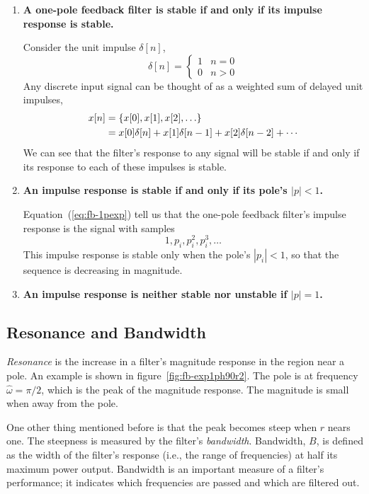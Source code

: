 \begin{enumerate}
\item \textbf{A one-pole feedback filter is stable if and only if its
impulse response is stable.}

Consider the unit impulse $\delta[n]$,
\begin{equation}
\delta[n] = 
\left\{\begin{array}{rl}
1 & n=0\\
0 & n>0
\end{array}\right.
\end{equation}
Any discrete input signal can be thought of as a weighted sum of
delayed unit impulses,
\begin{align}
x[n] &= \{x[0], x[1], x[2], \ldots\} \notag \\
     &= x[0]\delta[n] + x[1]\delta[n-1] + x[2]\delta[n-2] + \cdots
\end{align}
We can see that the filter's response to any signal will be stable if
and only if its response to each of these impulses is stable.

\item \textbf{An impulse response is stable if and only if its pole's
$|p|<1$.}

Equation~(\ref{eq:fb-1pexp}) tell us that the 
one-pole feedback filter's impulse response is the signal with samples
\begin{equation}
1, p_i, p_i^2, p_i^3, \ldots
\end{equation}
This impulse response is stable only when the pole's $|p_i|<1$, so
that the sequence is decreasing in magnitude.

\item \textbf{An impulse response is neither stable nor unstable if
$|p|=1$.}
\end{enumerate}

\subsection{Resonance and Bandwidth}

\emph{Resonance} is the increase in a filter's magnitude response in
the region near a pole. An example is shown in
figure~\ref{fig:fb-exp1ph90r2}. The pole is at frequency
$\hat{\omega}=\pi/2$, which is the peak of the magnitude response. The
magnitude is small when away from the pole.

One other thing mentioned before is that the peak becomes steep
when $r$ nears one. The steepness is measured by the filter's
\emph{bandwidth}.
Bandwidth, $B$, is defined as the width of the
filter's response (i.e., the range of frequencies) at half its maximum
power output. Bandwidth is an important measure of a filter's
performance; it indicates which frequencies are passed and which are
filtered out.

